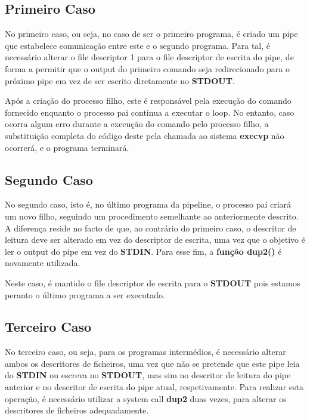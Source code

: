 \documentclass{report}
\begin{document}
\subsection{Primeiro Caso}
No primeiro caso, ou seja, no caso de ser o primeiro programa, é criado um pipe que estabelece comunicação entre este e o segundo programa. Para tal, é necessário alterar o file descriptor 1 para o file descriptor de escrita do pipe, de forma a permitir que o output do primeiro comando seja redirecionado para o próximo pipe em vez de ser escrito diretamente no \textbf{STDOUT}.\par
Após a criação do processo filho, este é responsável pela execução do comando fornecido enquanto o processo pai continua a executar o loop. No entanto, caso ocorra algum erro durante a execução do comando pelo processo filho, a substituição completa do código deste pela chamada ao sistema \textbf{execvp} não ocorrerá, e o programa terminará.

\newpage
\subsection{Segundo Caso}
No segundo caso, isto é, no último programa da pipeline, o processo pai criará um novo filho, seguindo um procedimento semelhante ao anteriormente descrito. A diferença reside no facto de que, ao contrário do primeiro caso, o descritor de leitura deve ser alterado em vez do descriptor de escrita, uma vez que o objetivo é ler o output do pipe em vez do \textbf{STDIN}. Para esse fim, a \textbf{função dup2()} é novamente utilizada.\par
Neste caso, é mantido o file descriptor de escrita para o \textbf{STDOUT} pois estamos peranto o último programa a ser executado.

\subsection{Terceiro Caso}
No terceiro caso, ou seja, para os programas intermédios, é necessário alterar ambos os descritores de ficheiros, uma vez que não se pretende que este pipe leia do \textbf{STDIN} ou escreva no \textbf{STDOUT}, mas sim no descritor de leitura do pipe anterior e no descritor de escrita do pipe atual, respetivamente. Para realizar esta operação, é necessário utilizar a system call \textbf{dup2} duas vezes, para alterar os descritores de ficheiros adequadamente.\\
\end{document}
